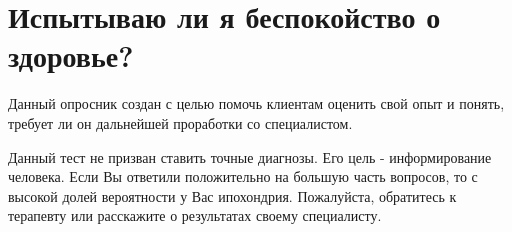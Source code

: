 \documentclass{../../shared/survey}
\begin{document}
\section*{\huge{Испытываю ли я беспокойство о здоровье?}}

\begin{flushleft}
Данный опросник создан с целью помочь клиентам оценить свой опыт и понять, требует ли он дальнейшей проработки со специалистом.
\end{flushleft}






\begin{flushleft}
Данный тест не призван ставить точные диагнозы. Его цель - информирование человека. Если Вы ответили положительно на большую часть вопросов, то с высокой долей вероятности у Вас ипохондрия. Пожалуйста, обратитесь к терапевту или расскажите о результатах своему специалисту.
\end{flushleft}
\end{document}

